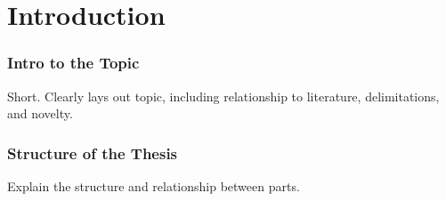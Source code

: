 \chapter{Introduction}

\subsection{Intro to the Topic}
Short.  Clearly lays out topic, including relationship to literature, delimitations, and novelty.  

\subsection{Structure of the Thesis}
Explain the structure and relationship between parts.

